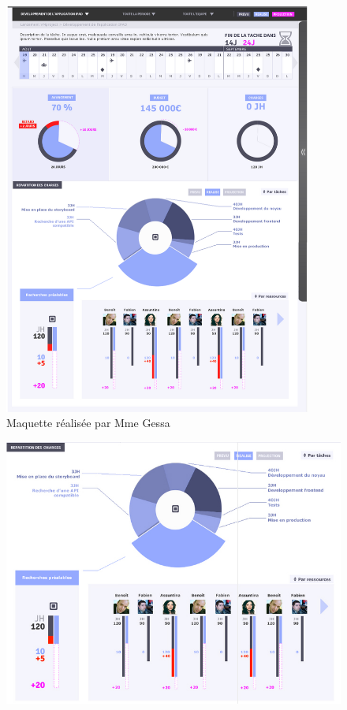 \documentclass[12pt]{report}
\begin{document}
\begin{appendices}
	\begin{figure}[!h]
	\centering
	\includegraphics[width=0.9\textwidth]{pictures/maquetteeux.png}
	\caption{Maquette réalisée par Mme Gessa}
	\label{a4}
\end{figure}

\begin{figure}[H]
	\centering
	\includegraphics[width=1\textwidth]{pictures/maquetteVersusmind/repartitionClicked.jpg}
	\caption{}
	\label{15}
\end{figure}


\end{appendices}
\end{document}
